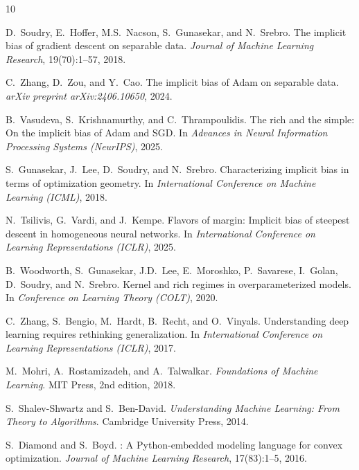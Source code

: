 \documentclass{article}
\begin{document}
\begin{thebibliography}{10}

D.~Soudry, E.~Hoffer, M.S.~Nacson, S.~Gunasekar, and N.~Srebro.
\newblock The implicit bias of gradient descent on separable data.
\newblock \emph{Journal of Machine Learning Research}, 19(70):1--57, 2018.

C.~Zhang, D.~Zou, and Y.~Cao.
\newblock The implicit bias of {A}dam on separable data.
\newblock \emph{arXiv preprint arXiv:2406.10650}, 2024.

B.~Vasudeva, S.~Krishnamurthy, and C.~Thrampoulidis.
\newblock The rich and the simple: On the implicit bias of {A}dam and {SGD}.
\newblock In \emph{Advances in Neural Information Processing Systems (NeurIPS)}, 2025.

S.~Gunasekar, J.~Lee, D.~Soudry, and N.~Srebro.
\newblock Characterizing implicit bias in terms of optimization geometry.
\newblock In \emph{International Conference on Machine Learning (ICML)}, 2018.

N.~Tsilivis, G.~Vardi, and J.~Kempe.
\newblock Flavors of margin: Implicit bias of steepest descent in homogeneous neural networks.
\newblock In \emph{International Conference on Learning Representations (ICLR)}, 2025.

B.~Woodworth, S.~Gunasekar, J.D.~Lee, E.~Moroshko, P.~Savarese, I.~Golan, D.~Soudry, and N.~Srebro.
\newblock Kernel and rich regimes in overparameterized models.
\newblock In \emph{Conference on Learning Theory (COLT)}, 2020.

C.~Zhang, S.~Bengio, M.~Hardt, B.~Recht, and O.~Vinyals.
\newblock Understanding deep learning requires rethinking generalization.
\newblock In \emph{International Conference on Learning Representations (ICLR)}, 2017.

M.~Mohri, A.~Rostamizadeh, and A.~Talwalkar.
\newblock \emph{Foundations of Machine Learning}.
\newblock MIT Press, 2nd edition, 2018.

S.~Shalev-Shwartz and S.~Ben-David.
\newblock \emph{Understanding Machine Learning: From Theory to Algorithms}.
\newblock Cambridge University Press, 2014.

S.~Diamond and S.~Boyd.
: A {P}ython-embedded modeling language for convex optimization.
\newblock \emph{Journal of Machine Learning Research}, 17(83):1--5, 2016.

\end{thebibliography}
\end{document}
